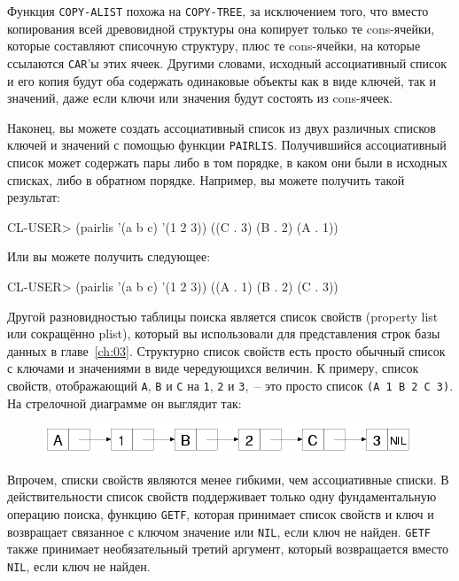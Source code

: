 Функция \lstinline{COPY-ALIST} похожа на \lstinline{COPY-TREE}, за исключением того, что вместо
копирования всей древовидной структуры она копирует только те cons-ячейки, которые
составляют списочную структуру, плюс те cons-ячейки, на которые ссылаются \lstinline{CAR}'ы
этих ячеек. Другими словами, исходный ассоциативный список и его копия будут оба содержать
одинаковые объекты как в виде ключей, так и значений, даже если ключи или значения будут
состоять из cons-ячеек.

Наконец, вы можете создать ассоциативный список из двух различных списков ключей и значений
с помощью функции \lstinline{PAIRLIS}. Получившийся ассоциативный список может содержать пары
либо в том порядке, в каком они были в исходных списках, либо в обратном
порядке. Например, вы можете получить такой результат:

\begin{myverb}
  CL-USER> (pairlis '(a b c) '(1 2 3))
  ((C . 3) (B . 2) (A . 1))
\end{myverb}

Или вы можете получить следующее:

\begin{myverb}
  CL-USER> (pairlis '(a b c) '(1 2 3))
  ((A . 1) (B . 2) (C . 3))
\end{myverb}

Другой разновидностью таблицы поиска является список свойств (property list или сокращённо
plist), который вы использовали для представления строк базы данных в главе~\ref{ch:03}.
Структурно список свойств есть просто обычный список с ключами и значениями в виде
чередующихся величин. К примеру, список свойств, отображающий \lstinline{A}, \lstinline{B} и
\lstinline{C} на \lstinline{1}, \lstinline{2} и \lstinline{3},~-- это просто список \lstinline{(A 1 B 2 C 3)}. На
стрелочной диаграмме он выглядит так:

\begin{figure}[h]
  \centering
  \includegraphics[scale=0.6]{images/plist-abc-123.png}
\end{figure}

Впрочем, списки свойств являются менее гибкими, чем ассоциативные списки. В
действительности список свойств поддерживает только одну фундаментальную операцию поиска,
функцию \lstinline{GETF}, которая принимает список свойств и ключ и возвращает связанное с
ключом значение или \lstinline{NIL}, если ключ не найден. \lstinline{GETF} также принимает
необязательный третий аргумент, который возвращается вместо \lstinline{NIL}, если ключ не
найден.

